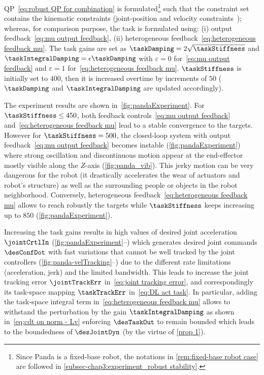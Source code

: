 QP~\cref{eq:robust QP for combination} is formulated\footnote{Since Panda is a fixed-base robot, the notations in \cref{rem:fixed-base robot case} are followed in \cref{subsec-chap3:experiment_robust stability}.} such that the constraint set contains the kinematic constraints (joint-position and velocity constraints~\cite{djeha2020ral}); whereas, for comparison purpose, the task is formulated using: (i) output feedback~\cref{eq:mu output feedback}, (ii) heterogeneous feedback~\cref{eq:heterogeneous feedback mu}. 
The task gains are set as $\taskDamping=2\sqrt{\taskStiffness}$ and $\taskIntegralDamping= \epsilon \taskDamping$ with $\varepsilon=0$ for~\cref{eq:mu output feedback} and $\varepsilon=1$ for~\cref{eq:heterogeneous feedback mu}. $\taskStiffness$ is initially set to $400$,  then it is increased overtime by increments of $50$ ($\taskDamping$ and $\taskIntegralDamping$ are updated accordingly). 

The experiment results are shown in~\cref{fig:pandaExperiment}. For $\taskStiffness\leq 450$, both feedback controls~\eqref{eq:mu output feedback} and~\eqref{eq:heterogeneous feedback mu} lead to a stable convergence to the targets. However for  $\taskStiffness=500$, the closed-loop system with output feedback~\eqref{eq:mu output feedback} becomes instable (\cref{fig:pandaExperiment}) where strong oscillation and discontinuous motion appear at the end-effector mostly visible along the $Z$-axis (\cref{fig:panda_vib}). This jerky motion can be very dangerous for the robot (it drastically accelerates  the wear of actuators and robot's structure) as well as the surrounding people or objects in the robot neighborhood. Conversely, heterogeneous feedback~\eqref{eq:heterogeneous feedback mu} allows to reach robustly the targets while $\taskStiffness$ keeps increasing up to $850$ (\cref{fig:pandaExperiment}). 

Increasing the task gains results in high values of desired joint acceleration $\jointCrtlIn$ (\cref{fig:pandaExperiment}--) which generates desired joint commands $\desConfDot$ with  fast variations that cannot be well tracked by the joint controllers (\cref{fig:panda-velTracking}--) due to the different rate limitations (acceleration, jerk) and the limited bandwidth. This leads to increase the joint tracking error $\jointTrackErr$ in~\cref{eq:joint tracking error}, and correspondingly its task-space mapping $\taskTrackErr$ in~\cref{eq:DL act task}. 
In particular, adding the task-space integral term in~\cref{eq:heterogeneous feedback mu} allows to withstand the perturbation by the gain $\taskIntegralDamping$ as shown in~\cref{eq:cdt on norm - Lv} enforcing $\desTaskOut $ to remain bounded which leads to the boundedness of $\desJointDyn $ (by the virtue of \cref{prop 1}). 

